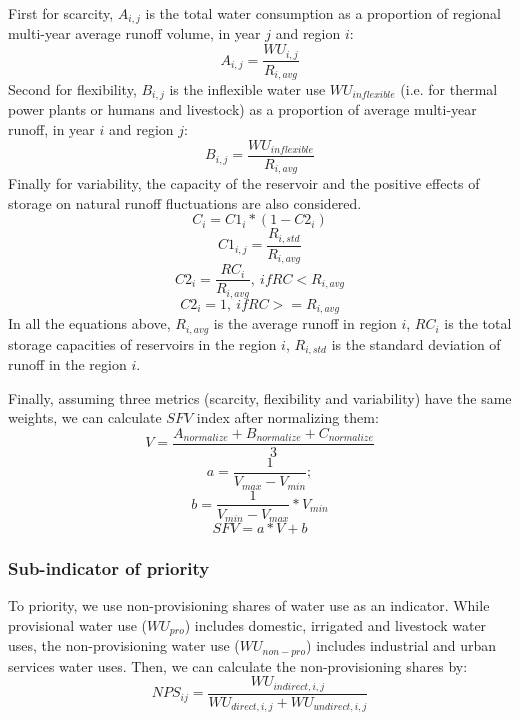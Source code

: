 \documentclass[9pt, twocolumn, twoside, lineno]{pnas-new}
\begin{document}
{	First for scarcity, $A_{i, j}$ is the total water consumption as a proportion of regional multi-year average runoff volume, in year $j$ and region $i$:
	$$ A_{i, j} = \frac{WU_{i,j}}{R_{i, avg}} $$
	Second for flexibility, $B_{i, j}$ is the inflexible water use $WU_{inflexible}$ (i.e. for thermal power plants or humans and livestock) as a proportion of average multi-year runoff, in year $i$ and region $j$:
	$$ B_{i, j} = \frac{WU_{inflexible}}{R_{i, avg}} $$
	Finally for variability, the capacity of the reservoir and the positive effects of storage on natural runoff fluctuations are also considered.
	$$ C_i = C1_i * (1 - C2_i) $$
	$$ C1_{i, j} = \frac{R_{i, std}}{R_{i, avg}} $$
	$$ C2_{i} = \frac{RC_{i}}{R_{i, avg}}, \ if RC < R_{i, avg} $$
	$$ C2_{i} = 1, \ if RC >= R_{i, avg} $$
	In all the equations above, $R_{i, avg}$ is the average runoff in region $i$, $RC_i$ is the total storage capacities of reservoirs in the region $i$, $R_{i, std}$ is the standard deviation of runoff in the region $i$.

	Finally, assuming three metrics (scarcity, flexibility and variability) have the same weights, we can calculate $SFV$ index after normalizing them:
	$$ V = \frac{A_{normalize} + B_{normalize} + C_{normalize}}{3} $$
	$$ a = \frac{1}{V_{max} - V_{min}}; $$
	$$ b = \frac{1}{V_{min} - V_{max}} * V_{min} $$
	$$ SFV = a * V + b $$

	\subsubsection*{Sub-indicator of priority}
	To priority, we use non-provisioning shares of water use as an indicator. While provisional water use ($WU_{pro}$) includes domestic, irrigated and livestock water uses, the non-provisioning water use ($WU_{non-pro}$) includes industrial and urban services water uses. Then, we can calculate the non-provisioning shares by:
	$$ NPS_{ij} = \frac{WU_{indirect, i, j}}{WU_{direct, i, j} + WU_{undirect, i, j}} $$

}
\end{document}
